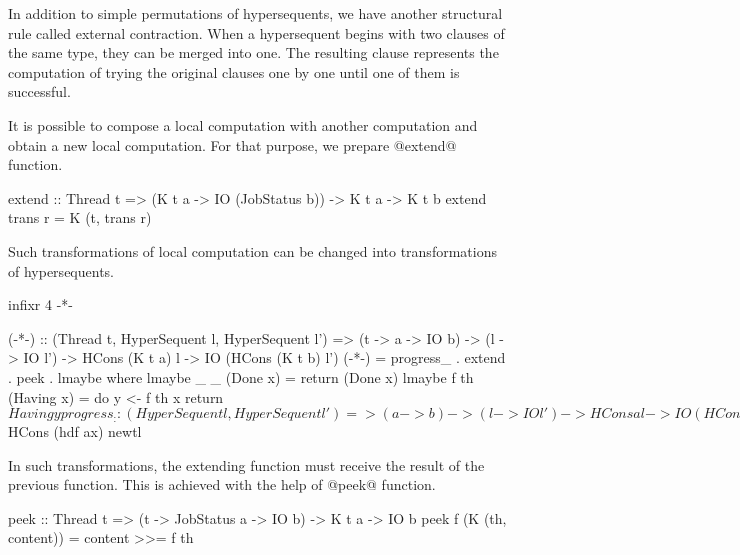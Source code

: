 In addition to simple permutations of hypersequents, we have another
structural rule called external contraction.  When a hypersequent begins
with two clauses of the same type, they can be merged into one.  The
resulting clause represents the computation of trying the original
clauses one by one until one of them is successful.

It is possible to compose a local computation with another computation
and obtain a new local computation.
For that purpose, we prepare @extend@ function.
\begin{code}
extend :: Thread t =>
  (K t a -> IO (JobStatus b)) -> K t a -> K t b
extend trans r = K (t, trans r)
\end{code}

Such transformations of local computation can be changed into
transformations of hypersequents.
\begin{code}
infixr 4 -*-

(-*-) :: (Thread t, HyperSequent l, HyperSequent l') =>
            (t -> a -> IO b) -> (l -> IO l') ->
            HCons (K t a) l -> IO (HCons (K t b) l')
(-*-) = progress_ . extend . peek . lmaybe
  where
    lmaybe _ _  (Done x) = return (Done x)
    lmaybe f th (Having x) =  do
      y <- f th x
      return $ Having y

progress_ :: (HyperSequent l, HyperSequent l') =>
            (a -> b) -> (l -> IO l') -> HCons a l ->
            IO (HCons b l')
progress_ hdf tlf (HCons ax bl) = do
  newtl <- tlf bl
  return $ HCons (hdf ax) newtl
\end{code}

In such transformations,
the extending function must receive the result of the previous function.
This is achieved with the help of @peek@ function.
\begin{code}
peek :: Thread t =>
  (t -> JobStatus a -> IO b) -> K t a -> IO b
peek f (K (th, content)) = content >>= f th
\end{code}

